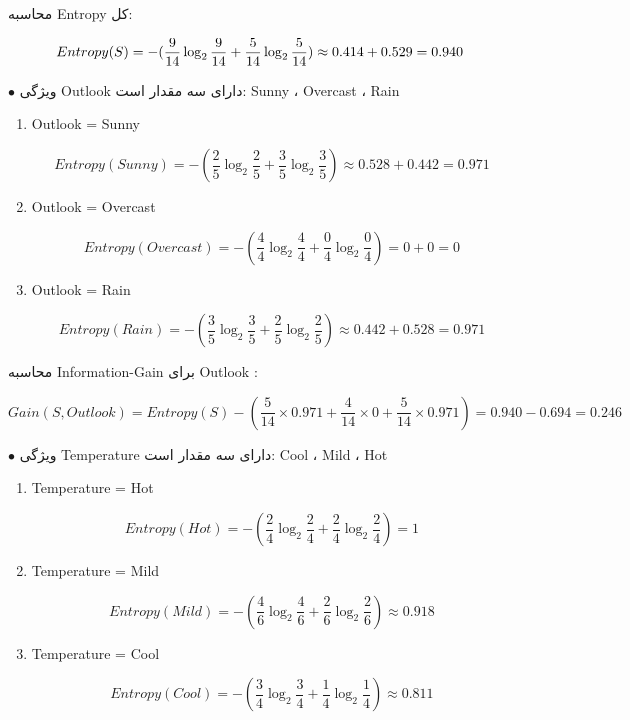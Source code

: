

محاسبه Entropy کل:

\[Entropy(S) = -(\frac{9}{14}\log_2{\frac{9}{14}} + \frac{5}{14}\log_2{\frac{5}{14}})
\\
 \approx 0.414 + 0.529 = 0.940
\]


$\bullet$ ویژگی Outlook دارای سه مقدار است: Sunny ، Overcast ، Rain

\setLTR
\begin{enumerate}
	\item Outlook = Sunny
	
	\[
	Entropy(Sunny) = -(\frac{2}{5}\log_2{\frac{2}{5}} + \frac{3}{5}\log_2{\frac{3}{5}})
	\approx 0.528+0.442=0.971
	\]
	
	\item Outlook = Overcast
	
	\[
	Entropy(Overcast) = -(\frac{4}{4}\log_2{\frac{4}{4}} + \frac{0}{4}\log_2{\frac{0}{4}})
	 = 0 + 0 = 0
	\]
	
	\item Outlook = Rain

	\[
	Entropy(Rain) = -(\frac{3}{5}\log_2{\frac{3}{5}} + \frac{2}{5}\log_2{\frac{2}{5}})
	\approx 0.442+0.528=0.971
	\]
\end{enumerate}
\setRTL 

محاسبه Information-Gain برای Outlook :


\[
Gain(S,Outlook) = Entropy(S) - (\frac{5}{14}\times0.971 + \frac{4}{14}\times0 + \frac{5}{14}\times0.971) = 0.940 - 0.694 = 0.246
\]



$\bullet$ ویژگی Temperature دارای سه مقدار است: Cool ، Mild ، Hot
\setLTR
\begin{enumerate}
	\item Temperature = Hot
	
	\[
	Entropy(Hot) = -(\frac{2}{4}\log_2{\frac{2}{4}} + \frac{2}{4}\log_2{\frac{2}{4}})
	= 1
	\]
	
	\item Temperature = Mild
	
	\[
	Entropy(Mild) = -(\frac{4}{6}\log_2{\frac{4}{6}} + \frac{2}{6}\log_2{\frac{2}{6}})
	\approx 0.918
	\]
	
	\item Temperature = Cool
	
	\[
	Entropy(Cool) = -(\frac{3}{4}\log_2{\frac{3}{4}} + \frac{1}{4}\log_2{\frac{1}{4}})
	\approx 0.811
	\]
\end{enumerate}
\setRTL 


